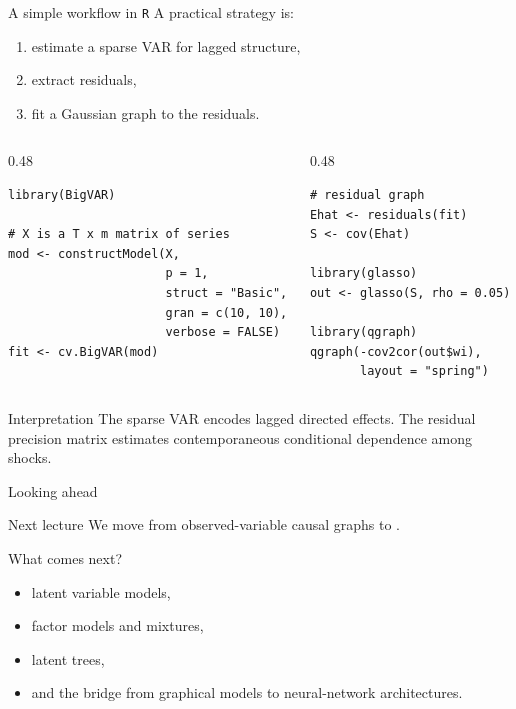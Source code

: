 \documentclass[dvipsnames,aspectratio=169,handout]{beamer}
\begin{document}
\begin{frame}[fragile]{A simple workflow in \texttt{R}}
A practical strategy is:
\begin{enumerate}
    \item estimate a sparse VAR for lagged structure,
    \item extract residuals,
    \item fit a Gaussian graph to the residuals.
\end{enumerate}

\begin{columns}[T,onlytextwidth]
\begin{column}{0.48\textwidth}
\begin{lstlisting}
library(BigVAR)

# X is a T x m matrix of series
mod <- constructModel(X,
                      p = 1,
                      struct = "Basic",
                      gran = c(10, 10),
                      verbose = FALSE)
fit <- cv.BigVAR(mod)
\end{lstlisting}
\end{column}
\begin{column}{0.48\textwidth}
\begin{lstlisting}
# residual graph
Ehat <- residuals(fit)
S <- cov(Ehat)

library(glasso)
out <- glasso(S, rho = 0.05)

library(qgraph)
qgraph(-cov2cor(out$wi),
       layout = "spring")
\end{lstlisting}
\end{column}
\end{columns}

\begin{alertblock}{Interpretation}
The sparse VAR encodes lagged directed effects.
The residual precision matrix estimates contemporaneous conditional dependence among shocks.
\end{alertblock}
\end{frame}

\begin{frame}{Looking ahead}
\begin{block}{Next lecture}
We move from observed-variable causal graphs to .
\end{block}

\begin{alertblock}{What comes next?}
\begin{itemize}
    \item latent variable models,
    \item factor models and mixtures,
    \item latent trees,
    \item and the bridge from graphical models to neural-network architectures.
\end{itemize}
\end{alertblock}
\end{frame}
\end{document}
